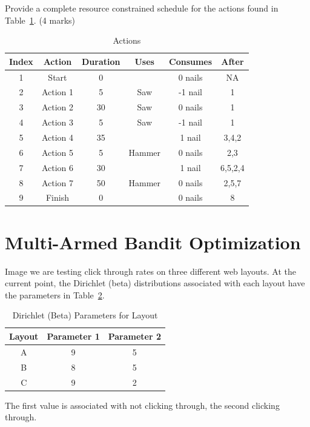 \documentclass{article}
\begin{document}
Provide a complete resource constrained schedule for the actions found in Table~\ref{schActions}. (4 marks)
\begin{table}[h!]
\caption{Actions}
\label{schActions}
\begin{center}
\begin{tabular}{ |c|c|c|c|c|c| } 
\hline
 Index & Action & Duration & Uses & Consumes & After \\
\hline
1 & Start & 0 &   & 0 nails & NA\\
2 & Action 1 & 5 &  Saw & -1 nail & 1\\
3 & Action 2 & 30 &  Saw & 0 nails & 1\\
4 & Action 3 & 5 &  Saw & -1 nail & 1\\
5 & Action 4 & 35 &   & 1 nail & 3,4,2\\
6 & Action 5 & 5 &  Hammer & 0 nails & 2,3\\
7 & Action 6 & 30 &   & 1 nail & 6,5,2,4\\
8 & Action 7 & 50 &  Hammer & 0 nails & 2,5,7\\
9 & Finish & 0 &   & 0 nails & 8\\
\hline
\end{tabular}
\end{center}
\end{table}
\clearpage
\section{Multi-Armed Bandit Optimization}

Image we are testing click through rates on three different web layouts. At the current point, the Dirichlet (beta) distributions associated with each layout have the parameters in Table~\ref{MABO1}.\begin{table}[h!]
\caption{Dirichlet (Beta) Parameters for Layout}
\label{MABO1}
\begin{center}
\begin{tabular}{ |c|c|c| } 
\hline
 Layout & Parameter 1 & Parameter 2 \\
\hline
A &  9  &  5 \\
B &  8  &  5 \\
C &  9  &  2 \\
\hline
\end{tabular}
\end{center}
\end{table}

The first value is associated with not clicking through, the second clicking through.
\end{document}
